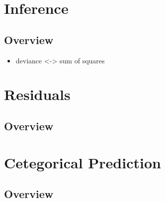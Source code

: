 \documentclass[11pt,fleqn]{book} %
\begin{document}


\chapter{Inference}

\section{Overview}

\begin{itemize}
	\item deviance <-> sum of squares
\end{itemize}



\chapter{Residuals}

\section{Overview}



\chapter{Cetegorical Prediction}

\section{Overview}
\end{document}
